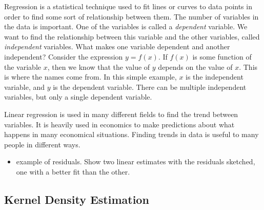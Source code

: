 \documentclass[a4paper,11pt]{article}
\begin{document}
   Regression is a statistical technique used to fit lines or curves to data
   points in order to find some sort of relationship between them. The number of
   variables in the data is important. One of the variables is called a \emph{dependent}
   variable. We want to find the relationship between this variable and the other
   variables, called \emph{independent} variables. What makes one variable
   dependent and another independent? Consider the expression $y=f(x)$. If $f(x)$
   is some function of the variable $x$, then we know that the value of $y$ depends
   on the value of $x$. This is where the names come from. In this simple example,
   $x$ is the independent variable, and $y$ is the dependent variable. There can be
   multiple independent variables, but only a single dependent variable.

   Linear regression is used in many different fields to find the trend between
   variables. It is heavily used in economics to make predictions about what
   happens in many economical situations. Finding trends in data is useful to many
   people in different ways.
\begin{itemize}
\item example of residuals. Show two linear estimates with the residuals sketched,
  one with a better fit than the other.
\end{itemize}
\subsection{Kernel Density Estimation}
\label{sec-2-4}
\end{document}
